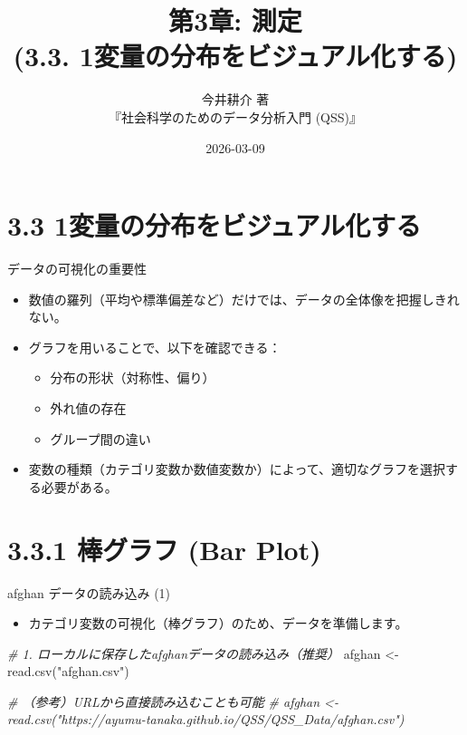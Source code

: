 \documentclass[
  ignorenonframetext,
]{beamer}
\title{第3章: 測定\\
(3.3. 1変量の分布をビジュアル化する)}
\subtitle{今井耕介 著\\
『社会科学のためのデータ分析入門 (QSS)』}
\author{}
\date{\vspace{-2.5em}2026-03-09}
\newenvironment{Shaded}{\begin{snugshade}}{\end{snugshade}}
\newcommand{\CommentTok}[1]{\textcolor[rgb]{0.56,0.35,0.01}{\textit{#1}}}
\newcommand{\FunctionTok}[1]{\textcolor[rgb]{0.00,0.00,0.00}{#1}}
\newcommand{\NormalTok}[1]{#1}
\newcommand{\OtherTok}[1]{\textcolor[rgb]{0.56,0.35,0.01}{#1}}
\newcommand{\StringTok}[1]{\textcolor[rgb]{0.31,0.60,0.02}{#1}}
\providecommand{\tightlist}{%
  \setlength{\itemsep}{0pt}\setlength{\parskip}{0pt}}
\begin{document}
\frame{\titlepage}

\hypertarget{ux5909ux91cfux306eux5206ux5e03ux3092ux30d3ux30b8ux30e5ux30a2ux30ebux5316ux3059ux308b}{%
\section{3.3
1変量の分布をビジュアル化する}\label{ux5909ux91cfux306eux5206ux5e03ux3092ux30d3ux30b8ux30e5ux30a2ux30ebux5316ux3059ux308b}}

\begin{frame}{データの可視化の重要性}
\protect\hypertarget{ux30c7ux30fcux30bfux306eux53efux8996ux5316ux306eux91cdux8981ux6027}{}
\begin{itemize}
\tightlist
\item
  数値の羅列（平均や標準偏差など）だけでは、データの全体像を把握しきれない。
\item
  グラフを用いることで、以下を確認できる：

  \begin{itemize}
  \tightlist
  \item
    分布の形状（対称性、偏り）
  \item
    外れ値の存在
  \item
    グループ間の違い
  \end{itemize}
\item
  変数の種類（カテゴリ変数か数値変数か）によって、適切なグラフを選択する必要がある。
\end{itemize}
\end{frame}

\hypertarget{ux68d2ux30b0ux30e9ux30d5-bar-plot}{%
\section{3.3.1 棒グラフ (Bar
Plot)}\label{ux68d2ux30b0ux30e9ux30d5-bar-plot}}

\begin{frame}[fragile]{afghan データの読み込み (1)}
\protect\hypertarget{afghan-ux30c7ux30fcux30bfux306eux8aadux307fux8fbcux307f-1}{}
\begin{itemize}
\tightlist
\item
  カテゴリ変数の可視化（棒グラフ）のため、データを準備します。
\end{itemize}

\scriptsize

\begin{Shaded}
\begin{Highlighting}[]
\CommentTok{\# 1. ローカルに保存したafghanデータの読み込み（推奨）}
\NormalTok{afghan }\OtherTok{\textless{}{-}} \FunctionTok{read.csv}\NormalTok{(}\StringTok{"afghan.csv"}\NormalTok{)}

\CommentTok{\# （参考）URLから直接読み込むことも可能}
\CommentTok{\# afghan \textless{}{-} read.csv("https://ayumu{-}tanaka.github.io/QSS/QSS\_Data/afghan.csv")}
\end{Highlighting}
\end{Shaded}

\normalsize
\end{frame}
\end{document}
